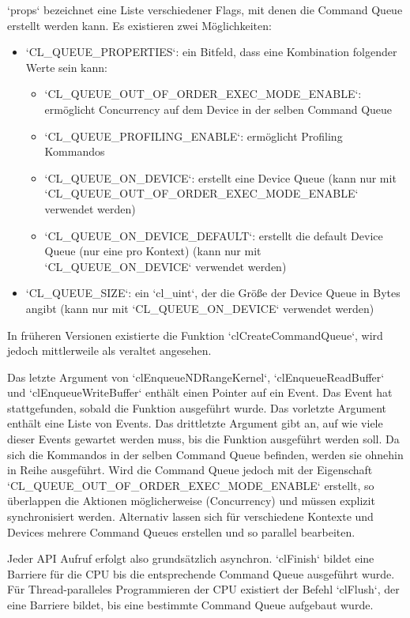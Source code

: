 		    \li`props` bezeichnet eine Liste  verschiedener Flags, mit denen die \Gls{Command Queue} erstellt werden kann. Es existieren zwei Möglichkeiten:
		    \begin{itemize}
			    \item \li`CL_QUEUE_PROPERTIES`: ein Bitfeld, dass eine Kombination folgender Werte sein kann:
			    \begin{itemize}
				    \item \li`CL_QUEUE_OUT_OF_ORDER_EXEC_MODE_ENABLE`: ermöglicht Concurrency auf dem Device in der selben \Gls{Command Queue}
				    \item \li`CL_QUEUE_PROFILING_ENABLE`: ermöglicht Profiling Kommandos
				    \item \li`CL_QUEUE_ON_DEVICE`: erstellt eine Device Queue (kann nur mit\\ \li`CL_QUEUE_OUT_OF_ORDER_EXEC_MODE_ENABLE` verwendet werden)
				    \item \li`CL_QUEUE_ON_DEVICE_DEFAULT`: erstellt die default Device Queue (nur eine pro Kontext) (kann nur mit \li`CL_QUEUE_ON_DEVICE` verwendet werden)
			    \end{itemize}
			    \item \li`CL_QUEUE_SIZE`: ein \li`cl_uint`, der die Größe der Device Queue in Bytes angibt (kann nur mit \li`CL_QUEUE_ON_DEVICE` verwendet werden)
		    \end{itemize}
		
	        In früheren Versionen existierte die Funktion \li`clCreateCommandQueue`, wird jedoch mittlerweile als veraltet angesehen.
		
		    Das letzte Argument von \li`clEnqueueNDRangeKernel`, \li`clEnqueueReadBuffer` und \li`clEnqueueWriteBuffer` enthält einen Pointer auf ein Event. Das Event hat stattgefunden, sobald die Funktion ausgeführt wurde. Das vorletzte Argument enthält eine Liste von Events. Das drittletzte Argument gibt an, auf wie viele dieser Events gewartet werden muss, bis die Funktion ausgeführt werden soll. Da sich die Kommandos in der selben \Gls{Command Queue} befinden, werden sie ohnehin in Reihe ausgeführt. Wird die \Gls{Command Queue} jedoch mit der Eigenschaft \li`CL_QUEUE_OUT_OF_ORDER_EXEC_MODE_ENABLE` erstellt, so überlappen die Aktionen möglicherweise (Concurrency) und müssen explizit synchronisiert werden. Alternativ lassen sich für verschiedene Kontexte und Devices mehrere \Glspl{Command Queue} erstellen und so parallel bearbeiten.
		
		    Jeder \Gls{API} Aufruf erfolgt also grundsätzlich asynchron. \li`clFinish` bildet eine Barriere für die CPU bis die entsprechende \Gls{Command Queue} ausgeführt wurde. Für Thread-paralleles Programmieren der CPU existiert der Befehl \li`clFlush`, der eine Barriere bildet, bis eine bestimmte \Gls{Command Queue} aufgebaut wurde.
			
